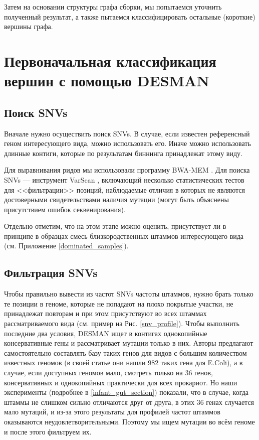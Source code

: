 \documentclass{spbau-diploma}
\begin{document}
Затем на основании структуры графа сборки, мы попытаемся уточнить полученный результат, а также  пытаемся классифицировать остальные (короткие) вершины графа.



\section{Первоначальная классификация вершин с помощью DESMAN}

\subsection{Поиск SNVs}

Вначале нужно осуществить поиск SNVs. В случае, если известен референсный геном интересующего вида, можно использовать его. Иначе можно использовать длинные контиги, которые по результатам биннинга принадлежат этому виду.

Для выравнивания ридов мы использовали программу BWA-MEM \cite{bwa_mem}. Для поиска SNVs --- инструмент VarScan \cite{VarScan}, включающий несколько статистических тестов для <<фильтрации>> позиций, наблюдаемые отличия в которых не являются достоверными свидетельствами наличия мутации (могут быть объяснены присутствием ошибок секвенирования). 

Отдельно отметим, что на этом этапе можно оценить, присутствует ли в принципе в образцах смесь близкородственных штаммов интересующего вида (см. Приложение  \ref{dominated_samples}).

\subsection{Фильтрация SNVs} 


Чтобы правильно вывести из частот SNVs частоты штаммов, нужно брать только те позиции в геноме, которые не попадают на плохо покрытые участки, не принадлежат повторам и при этом присутствуют во всех штаммах рассматриваемого вида (см. пример на Рис. \ref{snv_profile}). Чтобы выполнить последние два условия, DESMAN ищет в контигах однокопийные консервативные гены и рассматривает мутации только в них. Авторы предлагают самостоятельно составлять базу таких генов для видов с большим количеством известных геномов (в своей статье они нашли 982 таких гена для E.Coli), а в случае, если доступных геномов мало, смотреть только на 36 генов, консервативных и однокопийных практически для всех прокариот. Но наши эксперименты (подробнее в \ref{infant_gut_section}) показали, что в случае, когда штаммы не слишком сильно отличаются друг от друга, в этих 36 генах случается мало мутаций, и из-за этого результаты для профилей частот штаммов оказываются неудовлетворительными. Поэтому мы ищем мутации во всём геноме и после этого фильтруем их.
\end{document}
